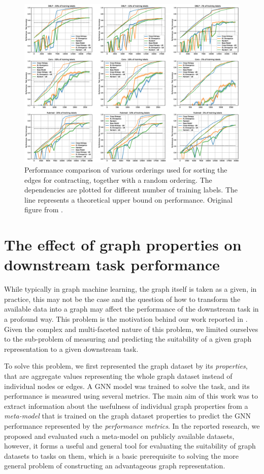 \begin{figure}
	\includegraphics[width=\linewidth]{images/direct-graph-coarsening-results.eps}
	\caption{Performance comparison of various orderings used for sorting the edges for contracting, together with a random ordering. The dependencies are plotted for different number of training labels. The line represents a theoretical upper bound on performance. Original figure from \cite{prochazka_scalable_2022}.}
	\label{fig:direct-graph-coarsening-results}
\end{figure}

\section{The effect of graph properties on downstream task performance}

While typically in graph machine learning, the graph itself is taken as a given, in practice, this may not be the case and the question of how to transform the available data into a graph may affect the performance of the downstream task in a profound way. This problem is the motivation behind our work reported in \cite{prochazka_which_2023}. Given the complex and multi-faceted nature of this problem, we limited ourselves to the sub-problem of measuring and predicting the suitability of a given graph representation to a given downstream task.

To solve this problem, we first represented the graph dataset by its \emph{properties}, that are aggregate values representing the whole graph dataset instead of individual nodes or edges. A GNN model \cite{hamilton_inductive_2017} was trained to solve the task, and its performance is measured using several metrics. The main aim of this work was to extract information about the usefulness of individual graph properties from a \emph{meta-model} that is trained on the graph dataset properties to predict the GNN performance represented by the \emph{performance metrics}.
In the reported research, we proposed and evaluated such a meta-model on publicly available datasets, however, it forms a useful and general tool for evaluating the suitability of graph datasets to tasks on them, which is a basic prerequisite to solving the more general problem of constructing an advantageous graph representation.

